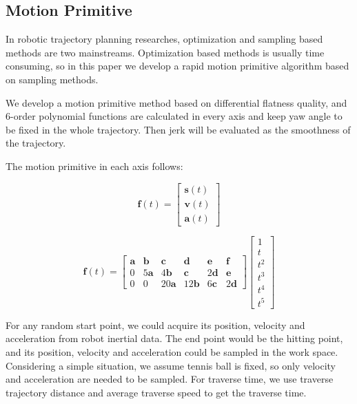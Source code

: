 \documentclass{jarticle}
\begin{document}
\subsection{Motion Primitive}
In robotic trajectory planning researches, optimization and sampling based methods are two mainstreams. Optimization based methods is usually time consuming, so in this paper we develop a rapid motion primitive algorithm based on sampling methods.

We develop a motion primitive method based on differential flatness quality, and 6-order polynomial functions are calculated in every axis and keep yaw angle to be fixed in the whole trajectory. Then jerk will be evaluated as the smoothness of the trajectory\cite{eth-juggling}.

The motion primitive in each axis follows:

\begin{equation}
  \label{eq:temp}
  \bm{f}(t) = \left[ \begin{array}{c}
      \bm{s}(t) \\
      \bm{v}(t) \\
      \bm{a}(t)
    \end{array}\right]
\end{equation}

\begin{equation}
  \label{eq:temp2}
  \bm{f}(t) = \begin{bmatrix}
      \bm{a} & \bm{b} & \bm{c} & \bm{d} & \bm{e} & \bm{f} \\
      0 & 5\bm{a} & 4\bm{b} & \bm{c} & 2\bm{d} & \bm{e} \\
      0 & 0 & 20\bm{a} & 12\bm{b} & 6\bm{c} & 2\bm{d}
  \end{bmatrix}
  \left[ \begin{array}{c}
      1 \\
      t \\
      t^2 \\
      t^3 \\
      t^4 \\
      t^5
    \end{array}\right]
\end{equation}


For any random start point, we could acquire its position, velocity and acceleration from robot inertial data. The end point would be the hitting point, and its position, velocity and acceleration could be sampled in the work space. Considering a simple situation, we assume tennis ball is fixed, so only velocity and acceleration are needed to be sampled. For traverse time, we use traverse trajectory distance and average traverse speed to get the traverse time.
\end{document}

